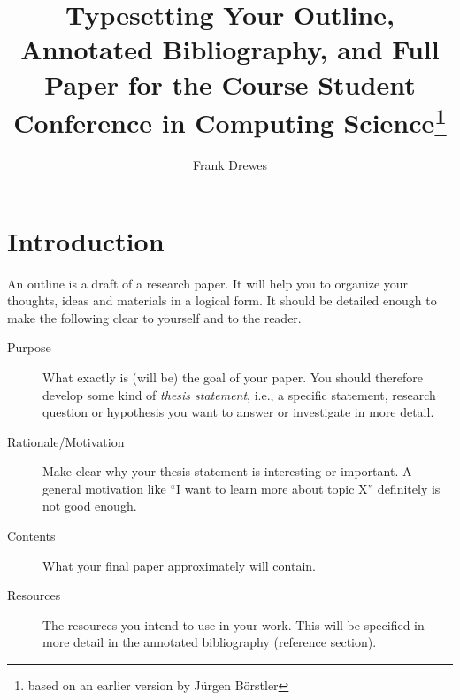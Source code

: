 \documentclass[runningheads,a4paper,oribibl]{llncs}
\begin{document}
\pagestyle{headings}

\mainmatter

\title{Typesetting Your Outline, Annotated Bibliography, and Full Paper for the Course Student Conference in Computing Science\thanks{based on an earlier version by Jürgen Börstler}}


\author{Frank Drewes}


\maketitle

%
%


\section{Introduction}
An outline is a draft of a research paper. It will help you to organize
your thoughts, ideas and materials in a logical form.
It should be detailed enough to make the following clear to yourself and
to the reader.
\begin{description}
   \item[Purpose] What exactly is (will be) the goal of your paper.
         You should therefore develop some kind of \emph{thesis statement},
         i.e., a specific statement, research question or hypothesis you
         want to answer or investigate in more detail.
   \item[Rationale/Motivation] Make clear why your thesis
         statement is interesting or important. A general motivation like
         ``I want to learn more about topic X'' definitely is not good enough.
   \item[Contents] What your final paper approximately will contain.
   \item[Resources] The resources you intend to use in your work. This
         will be specified in more detail in the annotated bibliography
         (reference section).
\end{description}
\end{document}
